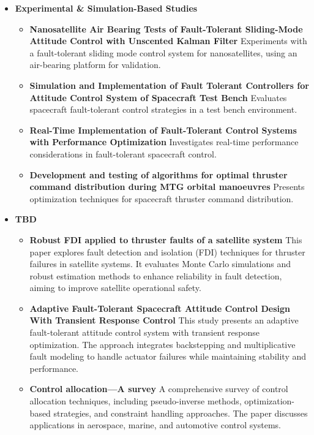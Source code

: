 \begin{itemize}
    \item \textbf{Experimental \& Simulation-Based Studies}
    \begin{itemize}
        \item \textbf{Nanosatellite Air Bearing Tests of Fault-Tolerant Sliding-Mode Attitude Control with Unscented Kalman Filter} \cite{PostNanosatelliteFilter} Experiments with a fault-tolerant sliding mode control system for nanosatellites, using an air-bearing platform for validation.
        \item \textbf{Simulation and Implementation of Fault Tolerant Controllers for Attitude Control System of Spacecraft Test Bench} \cite{LeonSernaSimulationBench} Evaluates spacecraft fault-tolerant control strategies in a test bench environment.
        \item \textbf{Real-Time Implementation of Fault-Tolerant Control Systems with Performance Optimization} \cite{Yin2013Real-TimeOptimization} Investigates real-time performance considerations in fault-tolerant spacecraft control.
        \item \textbf{Development and testing of algorithms for optimal thruster command distribution during MTG orbital manoeuvres} \cite{DevelopmentManoeuvres} Presents optimization techniques for spacecraft thruster command distribution.
    \end{itemize}
    \item \textbf{TBD}
    \begin{itemize}
    \item \textbf{Robust FDI applied to thruster faults of a satellite system} \cite{Patton2010RobustSystem} This paper explores fault detection and isolation (FDI) techniques for thruster failures in satellite systems. It evaluates Monte Carlo simulations and robust estimation methods to enhance reliability in fault detection, aiming to improve satellite operational safety.

    \item \textbf{Adaptive Fault-Tolerant Spacecraft Attitude Control Design With Transient Response Control} \cite{Bustan2014AdaptiveControl} This study presents an adaptive fault-tolerant attitude control system with transient response optimization. The approach integrates backstepping and multiplicative fault modeling to handle actuator failures while maintaining stability and performance.

    \item \textbf{Control allocation—A survey} \cite{Johansen2013ControlSurvey} A comprehensive survey of control allocation techniques, including pseudo-inverse methods, optimization-based strategies, and constraint handling approaches. The paper discusses applications in aerospace, marine, and automotive control systems.


\end{itemize}
\end{itemize}
